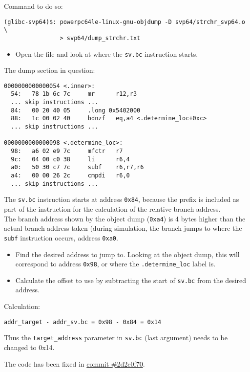 Command to do so:

\begin{verbatim}
(glibc-svp64)$: powerpc64le-linux-gnu-objdump -D svp64/strchr_svp64.o \
                > svp64/dump_strchr.txt
\end{verbatim}


\begin{itemize}
  \item Open the file and look at where the \texttt{sv.bc} instruction starts.
\end{itemize}

The dump section in question:

\begin{verbatim}
0000000000000054 <.inner>:
  54:   78 1b 6c 7c     mr      r12,r3
  ... skip instructions ...
  84:   00 20 40 05     .long 0x5402000
  88:   1c 00 02 40     bdnzf   eq,a4 <.determine_loc+0xc>
  ... skip instructions ...

0000000000000098 <.determine_loc>:
  98:   a6 02 e9 7c     mfctr   r7
  9c:   04 00 c0 38     li      r6,4
  a0:   50 30 c7 7c     subf    r6,r7,r6
  a4:   00 00 26 2c     cmpdi   r6,0
  ... skip instructions ...
\end{verbatim}

The \texttt{sv.bc} instruction starts at address \texttt{0x84}, because
the prefix is included as part of the instruction for the calculation of the
relative branch address.\\

The branch address shown by the object dump (\texttt{0xa4}) is 4 bytes higher
than the actual branch address taken (during simulation, the branch jumps to
where the \texttt{subf} instruction occurs, address \texttt{0xa0}.


\begin{itemize}
  \item Find the desired address to jump to. Looking at the object dump,
  this will correspond to address \texttt{0x98}, or where the
\texttt{.determine\_loc} label is.
  \item Calculate the offset to use by subtracting the start of \texttt{sv.bc}
  from the desired address.
\end{itemize}

Calculation:

\begin{verbatim}
addr_target - addr_sv.bc = 0x98 - 0x84 = 0x14
\end{verbatim}

Thus the \texttt{target\_address} parameter in \texttt{sv.bc}
(last argument) needs to be changed to {0x14}.

The code has been fixed in
\href{https://git.vantosh.com/ngisearch/glibc-svp64/commit/2d2c0f70dc5cca10a1c5d92d726406903f9e5b23}{commit \#2d2c0f70}.
